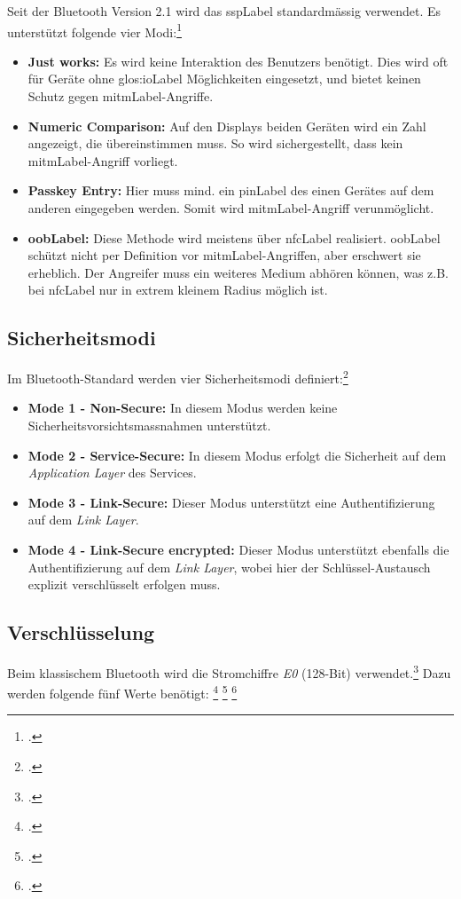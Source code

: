 Seit der Bluetooth Version 2.1 wird das \gls{sspLabel} standardmässig verwendet. Es unterstützt folgende vier Modi:\footcite{Bluetooth_Wikipedia_2015-04-17}
\begin{itemize}
	\item \textbf{Just works:} Es wird keine Interaktion des Benutzers benötigt. Dies wird oft für Geräte ohne \gls{glos:ioLabel} Möglichkeiten eingesetzt, und bietet keinen Schutz gegen \gls{mitmLabel}-Angriffe.
	\item \textbf{Numeric Comparison:} Auf den Displays beiden Geräten wird ein Zahl angezeigt, die übereinstimmen muss. So wird sichergestellt, dass kein \gls{mitmLabel}-Angriff vorliegt.
	\item \textbf{Passkey Entry:} Hier muss mind. ein \gls{pinLabel} des einen Gerätes auf dem anderen eingegeben werden. Somit wird \gls{mitmLabel}-Angriff verunmöglicht.
	\item \textbf{\gls{oobLabel}:} Diese Methode wird meistens über \gls{nfcLabel} realisiert.
		\gls{oobLabel} schützt nicht per Definition vor \gls{mitmLabel}-Angriffen, aber erschwert sie erheblich. Der Angreifer muss ein weiteres Medium abhören können, was z.B. bei \gls{nfcLabel} nur in extrem kleinem Radius möglich ist.
\end{itemize}


\subsection{Sicherheitsmodi}
Im Bluetooth-Standard werden vier Sicherheitsmodi definiert:\footcite{Security_Bluetooth_Development_Portal_2015-04-24}
\begin{itemize}
	\item \textbf{Mode 1 - Non-Secure:} In diesem Modus werden keine Sicherheitsvorsichtsmassnahmen unterstützt.
	\item \textbf{Mode 2 - Service-Secure:} In diesem Modus erfolgt die Sicherheit auf dem \textit{Application Layer} des Services.
	\item \textbf{Mode 3 - Link-Secure:} Dieser Modus unterstützt eine Authentifizierung auf dem \textit{Link Layer}.
	\item \textbf{Mode 4 - Link-Secure encrypted:} Dieser Modus unterstützt ebenfalls die Authentifizierung auf dem \textit{Link Layer}, wobei hier der Schlüssel-Austausch explizit verschlüsselt erfolgen muss.
\end{itemize}

\subsection{Verschlüsselung}
Beim klassischem Bluetooth wird die Stromchiffre \textit{E0} (128-Bit) verwendet.\footcite{E0_cipher_Wikipedia_2015-04-27}
Dazu werden folgende fünf Werte benötigt:
\footcite{LE_Security_Bluetooth_Development_Portal_2015-04-25}
\footcite{Bluetooth_Communication_Hybrid_Encryption_2015-04-25}
\footcite{BluetoothSecurity_Washington_2015-04-25}

